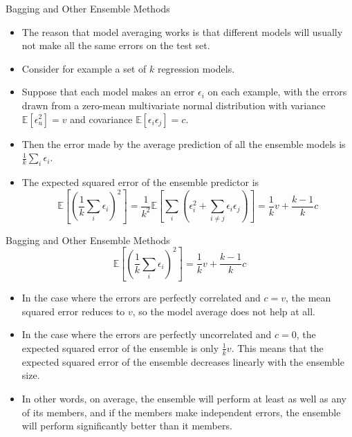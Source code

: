 \documentclass[10pt]{beamer}
\begin{document}
	\begin{frame}{Bagging and Other Ensemble Methods}
		\begin{itemize}
			\item The reason that model averaging works is that different models will usually not make all the same errors on the test set.
			\pause
			\item Consider for example a set of $k$ regression models. 
			\pause
			\item Suppose that each model makes an error $\epsilon_i$ on each example, with the errors drawn from a zero-mean multivariate normal distribution with variance $\mathbb{E}[\epsilon_u^2]=v$ and covariance $\mathbb{E}[\epsilon_i\epsilon_j]=c$.
			\pause
			\item Then the error made by the average prediction of all the ensemble models is $\frac{1}{k}\sum_i\epsilon_i$.
			\pause
			\item The expected squared error of the ensemble predictor is
			$$\mathbb{E}\left[\left(\frac{1}{k}\sum_i\epsilon_i\right)^2\right]=\frac{1}{k^2}\mathbb{E}\left[\sum_i\left(\epsilon_i^2+\sum_{i\neq j}\epsilon_i\epsilon_j\right)\right]=\frac{1}{k}v+\frac{k-1}{k}c$$
		\end{itemize}
	\end{frame}
	
	\begin{frame}{Bagging and Other Ensemble Methods}
		$$\mathbb{E}\left[\left(\frac{1}{k}\sum_i\epsilon_i\right)^2\right]=\frac{1}{k}v+\frac{k-1}{k}c$$
		\begin{itemize}
			\item In the case where the errors are perfectly correlated and $c=v$, the mean squared error reduces to $v$, so the model average does not help at all.
			\pause
			\item In the case where the errors are perfectly uncorrelated and $c=0$, the expected squared error of the ensemble is only $\frac{1}{k}v$. This means that the expected squared error of the ensemble decreases linearly with the ensemble size.
			\pause
			\item In other words, on average, the ensemble will perform at least as well as any of its members, and if the members make independent errors, the ensemble will perform significantly better than it members.
		\end{itemize}
	\end{frame}
	
\end{document}
